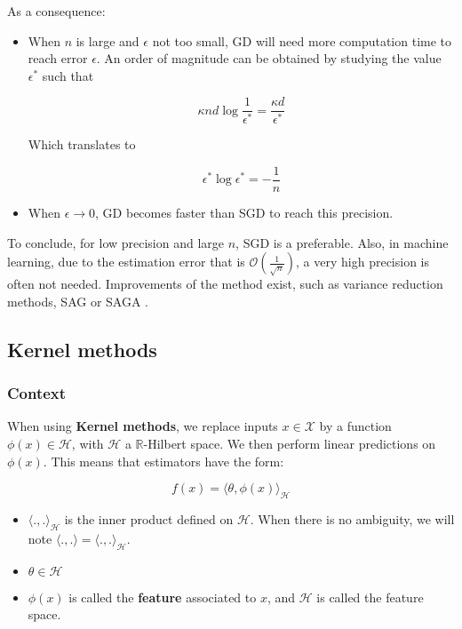 \documentclass[
10pt, %
a4paper, %
oneside, %
headinclude,footinclude, %
BCOR5mm, %
]{scrartcl}
\begin{document}
As a consequence:
\begin{itemize}
    \item When $n$ is large and $\epsilon$ not too small, GD will need more computation time to reach error $\epsilon$. An order of magnitude can be obtained by studying the value $\epsilon^*$ such that

	\begin{equation}
	   \kappa nd \log \frac{1}{\epsilon^*}  = \frac{\kappa d}{\epsilon^*} 
	\end{equation}

	Which translates to

	\begin{equation}
	    \epsilon^* \log \epsilon^* = -\frac{1}{n}  
	\end{equation}
    \item When $\epsilon \rightarrow 0$, GD becomes faster than SGD to reach this precision.
\end{itemize}

To conclude, for low precision and large $n$, SGD is a preferable. Also, in
machine learning, due to the estimation error that is $ \mathcal{O} (
\frac{1}{\sqrt{n} }) $, a very high precision is often not needed. Improvements
of the method exist, such as variance reduction methods, SAG or SAGA \cite[]{Schmidt2013}. 

\subsection{\large\color{MidnightBlue}Kernel methods}

\subsubsection{\large\color{Periwinkle}Context}

When using \textbf{{Kernel methods}}, we replace inputs $x\in  \mathcal{X} $ by a function $\phi(x)\in \mathcal{H}$, with $ \mathcal{H} $ a $ \mathbb{R} $-Hilbert space. We then perform linear predictions on $\phi(x)$. This means that estimators have the form: 

\begin{equation}
    f(x) = \langle\theta, \phi(x) \rangle_{ \mathcal{H} }
\end{equation}

\begin{itemize}
    \item $ \langle ., . \rangle_{ \mathcal{H} }$ is the inner product defined on $ \mathcal{H} $. When there is no ambiguity, we will note $ \langle ., . \rangle= \langle ., . \rangle_{ \mathcal{H} }$.
    \item $ \theta\in  \mathcal{H} $
    \item $ \phi(x)$ is called the \textbf{{feature}} associated to $x$, and $ \mathcal{H} $ is called the feature space.
\end{itemize}
\end{document}
